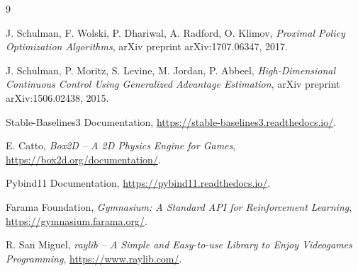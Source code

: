 \documentclass[a4paper, 12pt]{report}
\begin{document}
  \begin{thebibliography}{9}

    J. Schulman, F. Wolski, P. Dhariwal, A. Radford, O. Klimov,
    \textit{Proximal Policy Optimization Algorithms},
    arXiv preprint arXiv:1707.06347, 2017.

    J. Schulman, P. Moritz, S. Levine, M. Jordan, P. Abbeel,
    \textit{High-Dimensional Continuous Control Using Generalized Advantage Estimation},
    arXiv preprint arXiv:1506.02438, 2015.

    Stable-Baselines3 Documentation,
    \url{https://stable-baselines3.readthedocs.io/}.

    E. Catto,
    \textit{Box2D -- A 2D Physics Engine for Games},
    \url{https://box2d.org/documentation/}.

    Pybind11 Documentation,
    \url{https://pybind11.readthedocs.io/}.

    Farama Foundation,
    \textit{Gymnasium: A Standard API for Reinforcement Learning},
    \url{https://gymnasium.farama.org/}.

    R. San Miguel,
    \textit{raylib -- A Simple and Easy-to-use Library to Enjoy Videogames Programming},
    \url{https://www.raylib.com/}.

  \end{thebibliography}

  
\end{document}

